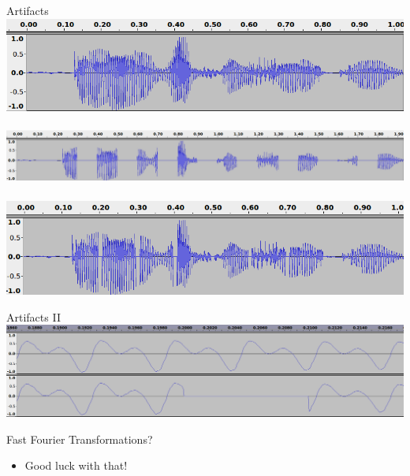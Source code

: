 \documentclass{beamer}
\begin{document}
	\begin{frame}{Artifacts}
		\centering
		\\
		\includegraphics[width=.9\textwidth]{Bilder/audio_normal_wave.png}\\
		\\
		\includegraphics[width=.9\textwidth]{Bilder/audio_silence_wave.png}\\
		\\
		\includegraphics[width=.9\textwidth]{Bilder/audio_removed_wave.png}
	\end{frame}
	
	\begin{frame}{Artifacts II}
		\centering
		\includegraphics[width=.9\textwidth]{Bilder/audio_dropped_frames.png}\\
		\vspace{1cm}
		\pause
		\begin{alertblock}{Fast Fourier Transformations?}
			\pause
			\begin{itemize}
				\item[] Good luck with that!
			\end{itemize}
		\end{alertblock}
	\end{frame}
	
\end{document}
